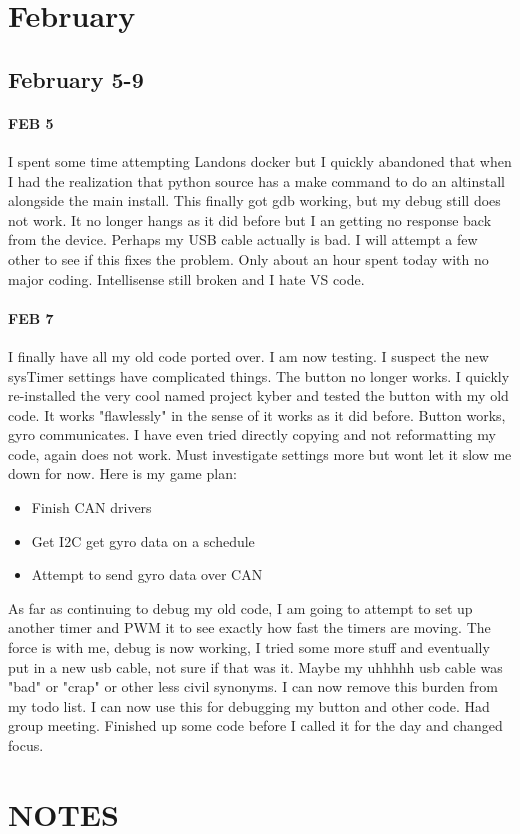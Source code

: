 \documentclass{article}
\begin{document}
\section{February}
\subsection{February 5-9}
\paragraph{FEB 5} I spent some time attempting Landons docker but I quickly abandoned that when I had the realization that python source has a make command to do an altinstall alongside the main install. This finally got gdb working, but my debug still does not work. It no longer hangs as it did before but I an getting no response back from the device. Perhaps my USB cable actually is bad. I will attempt a few other to see if this fixes the problem. Only about an hour spent today with no major coding. Intellisense still broken and I hate VS code. 
\paragraph{FEB 7} I finally have all my old code ported over. I am now testing. I suspect the new sysTimer settings have complicated things. The button no longer works. I quickly re-installed the very cool named project kyber and tested the button with my old code. It works "flawlessly" in the sense of it works as it did before. Button works, gyro communicates. I have even tried directly copying and not reformatting my code, again does not work. Must investigate settings more but wont let it slow me down for now. Here is my game plan:
\begin{itemize}
    \item Finish CAN drivers
    \item Get I2C get gyro data on a schedule
    \item Attempt to send gyro data over CAN
\end{itemize}
As far as continuing to debug my old code, I am going to attempt to set up another timer and PWM it to see exactly how fast the timers are moving. The force is with me, debug is now working, I tried some more stuff and eventually put in a new usb cable, not sure if that was it. Maybe my uhhhhh usb cable was "bad" or "crap" or other less civil synonyms. I can now remove this burden from my todo list. I can now use this for debugging my button and other code. Had group meeting. Finished up some code before I called it for the day and changed focus. 
\section{NOTES}


\end{document}
